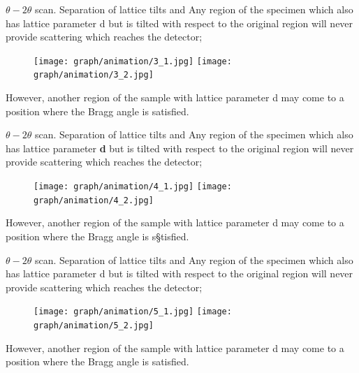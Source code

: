 \documentclass{beamer}
\begin{document}
\begin{frame}{$\theta-2\theta$ scan. Separation of lattice tilts and }
Any region of the specimen which also has lattice
parameter \fbox d but is tilted with respect to the original region will never provide
scattering which reaches the detector;
\begin{figure}[h] 
\centering
\texttt{[image: graph/animation/3\_1.jpg]} 
\texttt{[image: graph/animation/3\_2.jpg]} 
\end{figure}
However, another region of the sample with lattice parameter \fbox d may come to a position where the Bragg angle is satisfied.
\end{frame}

\begin{frame}{$\theta-2\theta$ scan. Separation of lattice tilts and }
Any region of the specimen which also has lattice
parameter {\bfseries{d}} but is tilted with respect to the original region will never provide
scattering which reaches the detector;
\begin{figure}[h] 
\centering
\texttt{[image: graph/animation/4\_1.jpg]} 
\texttt{[image: graph/animation/4\_2.jpg]} 
\end{figure}
However, another region of the sample with lattice parameter \fbox d may come to a position where the Bragg angle is s§tisfied.
\end{frame}

\begin{frame}{$\theta-2\theta$ scan. Separation of lattice tilts and }
Any region of the specimen which also has lattice
parameter \fbox d but is tilted with respect to the original region will never provide
scattering which reaches the detector;
\begin{figure}[h] 
\centering
\texttt{[image: graph/animation/5\_1.jpg]} 
\texttt{[image: graph/animation/5\_2.jpg]} 
\end{figure}
However, another region of the sample with lattice parameter \fbox d may come to a position where the Bragg angle is satisfied.
\end{frame}
\end{document}
